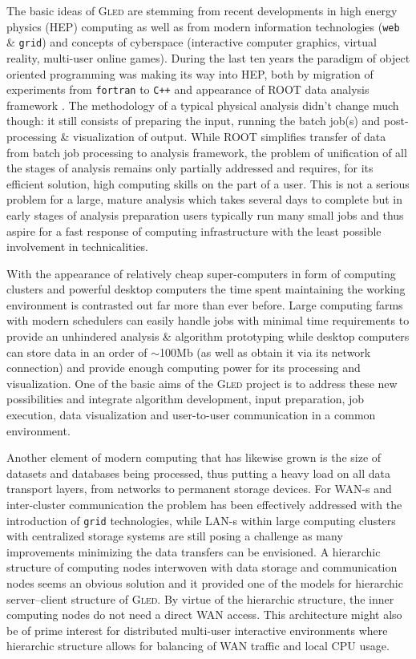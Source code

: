 \documentclass[final]{siamltex}
\def\gled{\textsc{Gled}\xspace}
\def\grid{\texttt{grid}\xspace}
\def\smalltt#1{{\small\texttt{#1}}}
\begin{document}
The basic ideas of \gled are stemming from recent developments in high
energy physics (HEP) computing as well as from modern information
technologies (\texttt{web} \& \texttt{grid}) and concepts of
cyberspace (interactive computer graphics, virtual reality, multi-user
online games). During the last ten years the paradigm of object oriented
programming was making its way into HEP, both by migration of
experiments from \smalltt{fortran} to \smalltt{C++} and appearance of
ROOT data analysis framework \cite{root}. The methodology of a typical
physical analysis didn't change much though: it still consists of
preparing the input, running the batch job(s) and post-processing \&
visualization of output. While ROOT simplifies transfer of data from
batch job processing to analysis framework, the problem of unification
of all the stages of analysis remains only partially addressed and
requires, for its efficient solution, high computing skills on the
part of a user. This is not a serious problem for a large, mature
analysis which takes several days to complete but in early stages of
analysis preparation users typically run many small jobs and thus
aspire for a fast response of computing infrastructure with the least
possible involvement in technicalities.

With the appearance of relatively cheap super-computers in form of
computing clusters and powerful desktop computers the time spent 
maintaining the working environment is contrasted out far more than
ever before. Large computing farms with modern schedulers can easily
handle jobs with minimal time requirements to provide an unhindered
analysis \& algorithm prototyping while desktop computers can store
data in an order of $\sim$100Mb (as well as obtain it via its network
connection) and provide enough computing power for its processing and
visualization. One of the basic aims of the \gled project is to
address these new possibilities and integrate algorithm development,
input preparation, job execution, data visualization and user-to-user
communication in a common environment.

Another element of modern computing that has likewise grown is the
size of datasets and databases being processed, thus putting a heavy
load on all data transport layers, from networks to permanent storage
devices. For WAN-s and inter-cluster communication the problem has
been effectively addressed with the introduction of \grid
technologies, while LAN-s within large computing clusters with
centralized storage systems are still posing a challenge as many
improvements minimizing the data transfers can be envisioned. A
hierarchic structure of computing nodes interwoven with data storage
and communication nodes seems an obvious solution and it provided one
of the models for hierarchic server--client structure of \gled. By
virtue of the hierarchic structure, the inner computing nodes do not
need a direct WAN access. This architecture might also be of prime
interest for distributed multi-user interactive environments where
hierarchic structure allows for balancing of WAN traffic and local CPU
usage.
\end{document}
